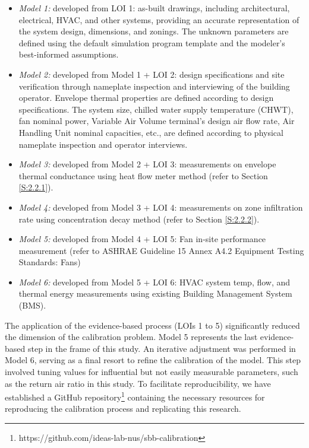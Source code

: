 \documentclass[3p,times,12pt]{elsarticle}
\begin{document}
\begin{sloppypar}
\begin{itemize}
\item \textit{Model 1:} developed from LOI 1: as-built drawings, including architectural, electrical, HVAC, and other systems, providing an accurate representation of the system design, dimensions, and zonings. The unknown parameters are defined using the default simulation program template and the modeler's best-informed assumptions.
\item \textit{Model 2:} developed from Model 1 + LOI 2: design specifications and site verification through nameplate inspection and interviewing of the building operator. Envelope thermal properties are defined according to design specifications. The system size, chilled water supply temperature (CHWT), fan nominal power, Variable Air Volume terminal's design air flow rate, Air Handling Unit nominal capacities, etc., are defined according to physical nameplate inspection and operator interviews.
\item \textit{Model 3:} developed from Model 2 + LOI 3: measurements on envelope thermal conductance using heat flow meter method (refer to Section \ref{S:2.2.1}).
\item \textit{Model 4:} developed from Model 3 + LOI 4: measurements on zone infiltration rate using concentration decay method (refer to Section \ref{S:2.2.2}).
\item \textit{Model 5:} developed from Model 4 + LOI 5: Fan in-site performance measurement (refer to ASHRAE Guideline 15 Annex A4.2 Equipment Testing Standards: Fans)
\item \textit{Model 6:} developed from Model 5 + LOI 6: HVAC system temp, flow, and thermal energy measurements using existing Building Management System (BMS).
\end{itemize}

The application of the evidence-based process (LOIs 1 to 5) significantly reduced the dimension of the calibration problem. Model 5 represents the last evidence-based step in the frame of this study. An iterative adjustment was performed in Model 6, serving as a final resort to refine the calibration of the model. This step involved tuning values for influential but not easily measurable parameters, such as the return air ratio in this study. To facilitate reproducibility, we have established a GitHub repository\footnote{https://github.com/ideas-lab-nus/sbb-calibration} containing the necessary resources for reproducing the calibration process and replicating this research.


\end{sloppypar}
\end{document}
